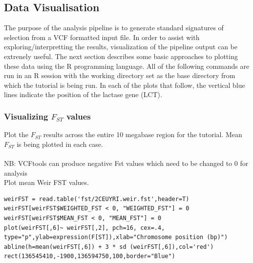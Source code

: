 \documentclass[a4paper,10pt]{article}
\begin{document}
\subsection{Data Visualisation}
The purpose of the analysis pipeline is to generate standard signatures of
selection from a VCF formatted input file. In order to assist with
exploring/interpretting the results, visualization of the pipeline
output can be extrenely useful.
The next section describes some basic approaches to 
plotting these data using the R programming language. All of the following
commands are run in an R session with the working directory set as the base
directory from which the tutorial is being run. In each of the plots
that follow, the vertical blue lines indicate the position of the
lactase gene (LCT). 
\subsubsection{Visualizing $F_{ST}$ values}

\noindent
Plot the $F_{ST}$ results across the entire 10 megabase region for the tutorial.  Mean $F_{ST}$ is being plotted in each case.\\
\\
NB: VCFtools can produce negative Fst values which need to be changed to 0 for analysis\\
\noindent
Plot mean Weir FST values.\\
\begin{verbatim}
weirFST = read.table('fst/2CEUYRI.weir.fst',header=T) 
weirFST[weirFST$WEIGHTED_FST < 0, "WEIGHTED_FST"] = 0
weirFST[weirFST$MEAN_FST < 0, "MEAN_FST"] = 0
plot(weirFST[,6]~ weirFST[,2], pch=16, cex=.4, 
type="p",ylab=expression(F[ST]),xlab="Chromosome position (bp)") 
abline(h=mean(weirFST[,6]) + 3 * sd (weirFST[,6]),col='red')
rect(136545410,-1900,136594750,100,border="Blue") 
\end{verbatim}
\end{document}
